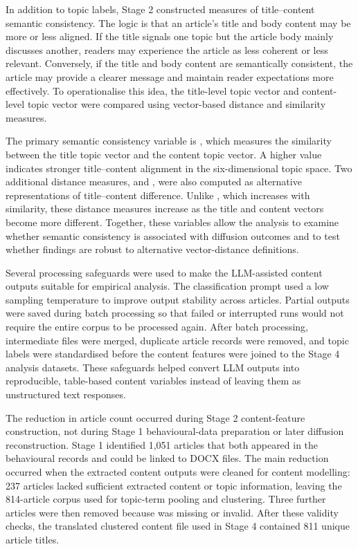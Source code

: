 In addition to topic labels, Stage 2 constructed measures of title–content semantic consistency. The logic is that an article’s title and body content may be more or less aligned. If the title signals one topic but the article body mainly discusses another, readers may experience the article as less coherent or less relevant. Conversely, if the title and body content are semantically consistent, the article may provide a clearer message and maintain reader expectations more effectively. To operationalise this idea, the title-level topic vector and content-level topic vector were compared using vector-based distance and similarity measures.

The primary semantic consistency variable is , which measures the similarity between the title topic vector and the content topic vector. A higher value indicates stronger title–content alignment in the six-dimensional topic space. Two additional distance measures,  and , were also computed as alternative representations of title–content difference. Unlike , which increases with similarity, these distance measures increase as the title and content vectors become more different. Together, these variables allow the analysis to examine whether semantic consistency is associated with diffusion outcomes and to test whether findings are robust to alternative vector-distance definitions.

Several processing safeguards were used to make the LLM-assisted content outputs suitable for empirical analysis. The classification prompt used a low sampling temperature to improve output stability across articles. Partial outputs were saved during batch processing so that failed or interrupted runs would not require the entire corpus to be processed again. After batch processing, intermediate files were merged, duplicate article records were removed, and topic labels were standardised before the content features were joined to the Stage 4 analysis datasets. These safeguards helped convert LLM outputs into reproducible, table-based content variables instead of leaving them as unstructured text responses.

The reduction in article count occurred during Stage 2 content-feature construction, not during Stage 1 behavioural-data preparation or later diffusion reconstruction. Stage 1 identified 1,051 articles that both appeared in the behavioural records and could be linked to DOCX files. The main reduction occurred when the extracted content outputs were cleaned for content modelling: 237 articles lacked sufficient extracted content or topic information, leaving the 814-article corpus used for topic-term pooling and clustering. Three further articles were then removed because  was missing or invalid. After these validity checks, the translated clustered content file used in Stage 4 contained 811 unique article titles.

